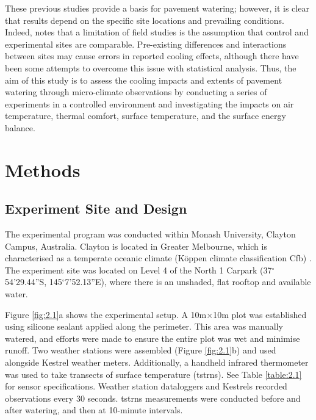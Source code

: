 \documentclass[final,3p,times,authoryear]{elsarticle}
\begin{document}
These previous studies provide a basis for pavement watering; however, it is clear that results depend on the specific site locations and prevailing conditions. Indeed, \cite{Hendel2016} notes that a limitation of field studies is the assumption that control and experimental sites are comparable. Pre-existing differences and interactions between sites may cause errors in reported cooling effects, although there have been some attempts to overcome this issue with statistical analysis. Thus, the aim of this study is to assess the cooling impacts and extents of pavement watering through micro-climate observations by conducting a series of experiments in a controlled environment and investigating the impacts on air temperature, thermal comfort, surface temperature, and the surface energy balance. 




\section{Methods}\label{sec:methods2}
\subsection{Experiment Site and Design}\label{sec:methods2.1}

The experimental program was conducted within Monash University, Clayton Campus, Australia. Clayton is located in Greater Melbourne, which is characterised as a temperate oceanic climate (K\"{o}ppen climate classification Cfb) \citep{Beck2018}. The experiment site was located on Level 4 of the North 1 Carpark (37$^{\circ}$54'29.44''S, 145$^{\circ}$7'52.13''E), where there is an unshaded, flat rooftop and available water.

Figure \ref{fig:2.1}a shows the experimental setup. A 10m$\times$10m plot was established using silicone sealant applied along the perimeter. This area was manually watered, and efforts were made to ensure the entire plot was wet and minimise runoff. Two weather stations were assembled (Figure \ref{fig:2.1}b) and used alongside Kestrel weather meters. Additionally, a handheld infrared thermometer was used to take transects of surface temperature (\gls{tstrns}). See Table \ref{table:2.1} for sensor specifications. Weather station dataloggers and Kestrels recorded observations every 30 seconds. \gls{tstrns} measurements were conducted before and after watering, and then at 10-minute intervals.
\end{document}
